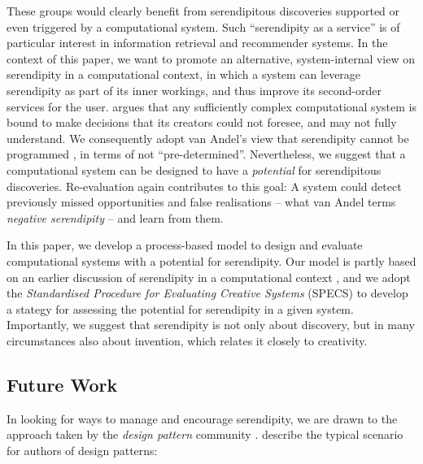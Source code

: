  

These groups would clearly benefit from serendipitous discoveries supported or even triggered by a computational system. Such ``serendipity as a service'' is of particular interest in information retrieval and recommender systems. In the context of this paper, we want to promote an alternative, system-internal view on serendipity in a computational context, in which a system can leverage serendipity as part of its inner workings, and thus improve its second-order services for the user.  argues that any sufficiently complex computational system is bound to make decisions that its creators could not foresee, and may not fully understand. We consequently adopt van Andel's view that serendipity cannot be programmed \cite[p.~646]{van1994anatomy}, in terms of not ``pre-determined''. Nevertheless, we suggest that a computational system can be designed to have a \emph{potential} for serendipitous discoveries. Re-evaluation again contributes to this goal: A system could detect previously missed opportunities and false realisations -- what van Andel \cite[p.~639]{van1994anatomy} terms \emph{negative serendipity} -- and learn from them.

In this paper, we develop a process-based model to design and evaluate computational systems with a potential for serendipity. Our model is partly based on an earlier discussion of serendipity in a computational context \cite{pease2013discussion}, and we adopt the \emph{Standardised Procedure for Evaluating Creative Systems} (SPECS) \cite{jordanous:12} to develop a stategy for assessing the potential for serendipity in a given system. Importantly, we suggest that serendipity is not only about discovery, but in many circumstances also about invention, which relates it closely to creativity.  


\subsection{Future Work} \label{sec:futurework} \label{sec:hatching}

In looking for ways to manage and encourage serendipity, we are drawn
to the approach taken by the \emph{design pattern} community
\cite{alexander1999origins}. 
 describe the typical scenario for authors of design patterns:

